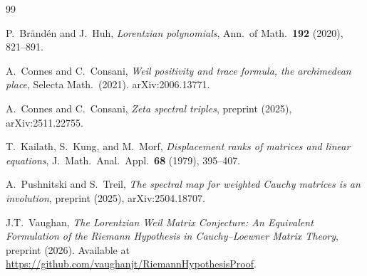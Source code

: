 \documentclass[11pt,a4paper]{article}
\begin{document}
\begin{thebibliography}{99}

P.~Br\"and\'en and J.~Huh,
\emph{Lorentzian polynomials},
Ann.\ of Math.\ \textbf{192} (2020), 821--891.

A.~Connes and C.~Consani,
\emph{Weil positivity and trace formula, the archimedean place},
Selecta Math.\ (2021).
arXiv:2006.13771.

A.~Connes and C.~Consani,
\emph{Zeta spectral triples},
preprint (2025), arXiv:2511.22755.

T.~Kailath, S.~Kung, and M.~Morf,
\emph{Displacement ranks of matrices and linear equations},
J.\ Math.\ Anal.\ Appl.\ \textbf{68} (1979), 395--407.

A.~Pushnitski and S.~Treil,
\emph{The spectral map for weighted Cauchy matrices is an involution},
preprint (2025), arXiv:2504.18707.

J.T.~Vaughan,
\emph{The Lorentzian Weil Matrix Conjecture: An Equivalent Formulation of the Riemann Hypothesis in Cauchy--Loewner Matrix Theory},
preprint (2026).
Available at \url{https://github.com/vaughanjt/RiemannHypothesisProof}.

\end{thebibliography}
\end{document}
